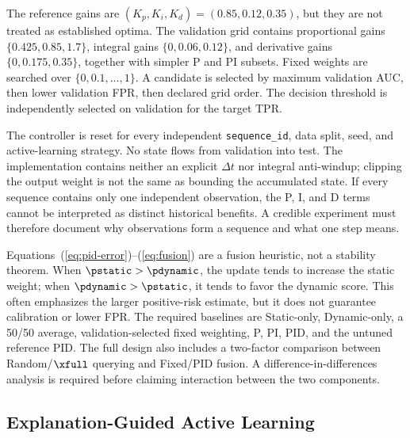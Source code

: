The reference gains are $(K_p,K_i,K_d)=(0.85,0.12,0.35)$, but they are not
treated as established optima. The validation grid contains proportional gains
$\{0.425,0.85,1.7\}$, integral gains $\{0,0.06,0.12\}$, and derivative gains
$\{0,0.175,0.35\}$, together with simpler P and PI subsets. Fixed weights are
searched over $\{0,0.1,\ldots,1\}$. A candidate is selected by maximum validation
AUC, then lower validation FPR, then declared grid order. The decision threshold
is independently selected on validation for the target TPR.

The controller is reset for every independent \texttt{sequence\_id}, data split, seed,
and active-learning strategy. No state flows from validation into test. The
implementation contains neither an explicit $\Delta t$ nor integral anti-windup;
clipping the output weight is not the same as bounding the accumulated state. If
every sequence contains only one independent observation, the P, I, and D terms
cannot be interpreted as distinct historical benefits. A credible experiment
must therefore document why observations form a sequence and what one step
means.

Equations~(\ref{eq:pid-error})--(\ref{eq:fusion}) are a fusion heuristic, not a
stability theorem. When $\pstatic>\pdynamic$, the update tends to increase the
static weight; when $\pdynamic>\pstatic$, it tends to favor the dynamic score.
This often emphasizes the larger positive-risk estimate, but it does not
guarantee calibration or lower FPR. The required baselines are Static-only,
Dynamic-only, a 50/50 average, validation-selected fixed weighting, P, PI, PID,
and the untuned reference PID. The full design also includes a two-factor
comparison between Random/$\xfull$ querying and Fixed/PID fusion. A
difference-in-differences analysis is required before claiming interaction
between the two components.

\subsection{Explanation-Guided Active Learning}


